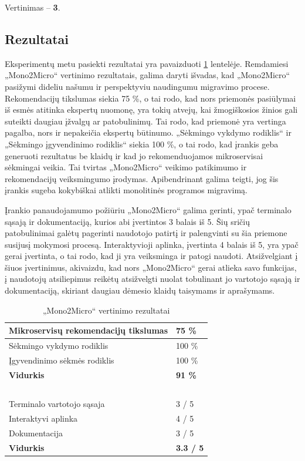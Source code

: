 \documentclass{VUMIFPSbakalaurinis}
\begin{document}
Vertinimas -- \textbf{3}.

\subsection{Rezultatai}
Eksperimentų metu pasiekti rezultatai yra pavaizduoti \ref{table:rezultatai} lentelėje. Remdamiesi „Mono2Micro“ vertinimo rezultatais, galima daryti išvadas, kad „Mono2Micro“ pasižymi dideliu našumu ir perspektyviu naudingumu migravimo procese. Rekomendacijų tikslumas siekia 75 \%, o tai rodo, kad nors priemonės pasiūlymai iš esmės atitinka ekspertų nuomonę, yra tokių atvejų, kai žmogiškosios žinios gali suteikti daugiau įžvalgų ar patobulinimų. Tai rodo, kad priemonė yra vertinga pagalba, nors ir nepakeičia ekspertų būtinumo. „Sėkmingo vykdymo rodiklis“ ir „Sėkmingo įgyvendinimo rodiklis“ siekia 100 \%, o tai rodo, kad įrankis geba generuoti rezultatus be klaidų ir kad jo rekomenduojamos mikroservisai sėkmingai veikia. Tai tvirtas „Mono2Micro“ veikimo patikimumo ir rekomendacijų veiksmingumo įrodymas. Apibendrinant galima teigti, jog šis įrankis sugeba kokybiškai atlikti monolitinės programos migravimą.

Įrankio panaudojamumo požiūriu „Mono2Micro“ galima gerinti, ypač terminalo sąsają ir dokumentaciją, kurios abi įvertintos 3 balais iš 5. Šių sričių patobulinimai galėtų pagerinti naudotojo patirtį ir palengvinti su šia priemone susijusį mokymosi procesą. Interaktyvioji aplinka, įvertinta 4 balais iš 5, yra ypač gerai įvertinta, o tai rodo, kad ji yra veiksminga ir patogi naudoti. Atsižvelgiant į šiuos įvertinimus, akivaizdu, kad nors „Mono2Micro“ gerai atlieka savo funkcijas, į naudotojų atsiliepimus reikėtų atsižvelgti nuolat tobulinant jo vartotojo sąsają ir dokumentaciją, skiriant daugiau dėmesio klaidų taisymams ir aprašymams.

\begin{table}[!ht]
    \centering
    \caption{„Mono2Micro“ vertinimo rezultatai}
    \label{table:rezultatai}
    \begin{tabular}{|l|l|}
    \hline
        Mikroservisų rekomendacijų tikslumas & 75 \% \\ \hline
        Sėkmingo vykdymo rodiklis & 100 \% \\ \hline
        Įgyvendinimo sėkmės rodiklis & 100 \% \\ \hline
        \textbf{Vidurkis} & \textbf{91 \%} \\ \hline
        ~ & ~ \\ \hline
        Terminalo vartotojo sąsaja & 3 / 5 \\ \hline
        Interaktyvi aplinka & 4 / 5 \\ \hline
        Dokumentacija & 3 / 5 \\ \hline
        \textbf{Vidurkis} & \textbf{3.3 / 5} \\ \hline
    \end{tabular}
\end{table}
\end{document}
